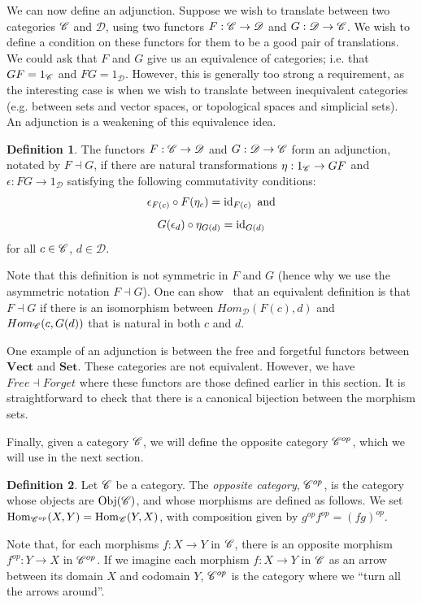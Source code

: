 \documentclass[a4paper,12pt,leqno]{article} \usepackage{amsmath}
\newcommand{\curD}{\mathscr{D}} \newcommand{\curI}{\mathscr{I}}
\newcommand{\id}{\ensuremath{\operatorname{id}}}
\newcommand{\Hom}{\ensuremath{\operatorname{Hom}}}
\newcommand{\Obj}{\ensuremath{\operatorname{Obj}}}
\theoremstyle{definition}
\newtheorem{defn}{Definition}
\begin{document}
We can now define an adjunction.
Suppose we wish to translate between two categories $\mathscr{C}$ and $\curD$, using
two functors $F: \curC\to \curD$ and $G: \curD\to\curC$.
We wish to define a condition on these functors for them to be a good pair of
translations.
We could ask that $F$ and $G$ give us an equivalence of categories; i.e. that
$GF = 1_{\mathscr{C}}$ and $FG = 1_{\curD}$.
However, this is generally too strong a requirement, as the interesting case is
when we wish to translate between inequivalent categories (e.g. between sets
and vector spaces, or topological spaces and simplicial sets).
An adjunction is a weakening of this equivalence idea. 

\begin{defn}
  The functors $F: \curC\to\curD$ and $G: \curD\to\curC$ form an adjunction,
  notated by $F\dashv G$, if there are natural transformations $\eta:
  1_{\mathscr{C}}\to GF$ and $\epsilon: FG\to 1_\curD$ satisfying the following 
  commutativity conditions:
  $$\epsilon_{F(c)}\of F(\eta_c) = \id_{F(c)}\text{ and} $$
  $$G(\epsilon_d)\of \eta_{G(d)} = \id_{G(d)}$$
  for all $c\in\mathscr{C}$, $d\in\curD$.
\end{defn}

Note that this definition is not symmetric in $F$ and $G$ (hence why we use the
asymmetric notation $F\dashv G$).
One can show~\cite[Section 4]{Riehl} that an equivalent definition is that
$F\dashv G$ if there is an isomorphism between $Hom_\curD(F(c), d)$ and
$Hom_{\mathscr{C}}(c, G(d))$ that is natural in both $c$ and $d$.

One example of an adjunction is between the free and forgetful functors between
$\textbf{Vect}$ and $\textbf{Set}$.
These categories are not equivalent.
However, we have $Free\dashv Forget$ where these functors are those defined
earlier in this section.
It is straightforward to check that there is a canonical bijection between the
morphism sets.

Finally, given a category $\mathscr{C}$, we will define the opposite category $\mathscr{C}^{op}$,
which we will use in the next section.
\begin{defn}
  Let $\mathscr{C}$ be a category.
  The \emph{opposite category}, $\mathscr{C}^{op}$, is the category whose objects are
  $\Obj(\curC)$, and whose morphisms are defined as follows.
  We set $\Hom_{\curC^{op}}(X, Y) = \Hom_{\curC}(Y, X)$, with composition given
  by $g^{op}f^{op} = (fg)^{op}$.
\end{defn}
Note that, for each morphisms $f: X\to Y$ in $\mathscr{C}$, there is an opposite
morphism $f^{op}: Y\to X$ in $\mathscr{C}^{op}$.
If we imagine each morphism $f: X\to Y$ in $\mathscr{C}$ as an arrow between its
domain $X$ and codomain $Y$, $\mathscr{C}^{op}$ is the category where we ``turn all
the arrows around''.
\end{document}
